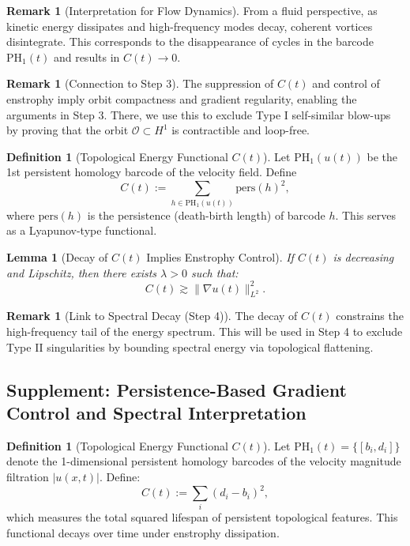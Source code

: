 \documentclass[11pt]{article}
\newtheorem{lemma}[theorem]{Lemma}
\theoremstyle{definition}
\newtheorem{definition}[theorem]{Definition}
\newtheorem{remark}[theorem]{Remark}
\begin{document}
\begin{remark}[Interpretation for Flow Dynamics]
From a fluid perspective, as kinetic energy dissipates and high-frequency modes decay, coherent vortices disintegrate. This corresponds to the disappearance of cycles in the barcode $\mathrm{PH}_1(t)$ and results in $C(t) \to 0$.
\end{remark}

\begin{remark}[Connection to Step 3]
The suppression of $C(t)$ and control of enstrophy imply orbit compactness and gradient regularity, enabling the arguments in Step 3. There, we use this to exclude Type I self-similar blow-ups by proving that the orbit $\mathcal{O} \subset H^1$ is contractible and loop-free.
\end{remark}

\begin{definition}[Topological Energy Functional $C(t)$] \label{def:topo-energy}
Let $\mathrm{PH}_1(u(t))$ be the 1st persistent homology barcode of the velocity field. Define
\[
C(t) := \sum_{h \in \mathrm{PH}_1(u(t))} \mathrm{pers}(h)^2,
\]
where $\mathrm{pers}(h)$ is the persistence (death-birth length) of barcode $h$. This serves as a Lyapunov-type functional.
\end{definition}

\begin{lemma}[Decay of $C(t)$ Implies Enstrophy Control]
If $C(t)$ is decreasing and Lipschitz, then there exists $\lambda > 0$ such that:
\[
C(t) \gtrsim \| \nabla u(t) \|_{L^2}^2.
\]
\end{lemma}

\begin{remark}[Link to Spectral Decay (Step 4)]
The decay of $C(t)$ constrains the high-frequency tail of the energy spectrum. This will be used in Step 4 to exclude Type II singularities by bounding spectral energy via topological flattening.
\end{remark}


\subsection*{Supplement: Persistence-Based Gradient Control and Spectral Interpretation}

\begin{definition}[Topological Energy Functional $C(t)$]
Let $\mathrm{PH}_1(t) = \{ [b_i, d_i] \}$ denote the 1-dimensional persistent homology barcodes of the velocity magnitude filtration $|u(x,t)|$. Define:
\[
C(t) := \sum_i (d_i - b_i)^2,
\]
which measures the total squared lifespan of persistent topological features. This functional decays over time under enstrophy dissipation.
\end{definition}
\end{document}
